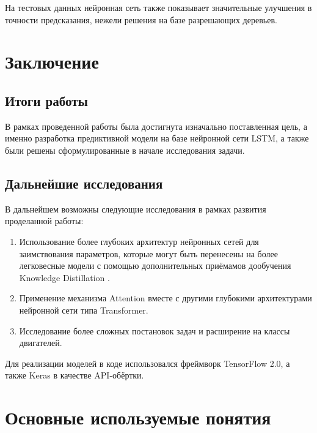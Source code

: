 \documentclass[14pt]{extarticle}
\begin{document}
На тестовых данных нейронная сеть также показывает значительные улучшения в точности предсказания, нежели решения на базе разрешающих деревьев.

\newpage

\section{Заключение}

\subsection{Итоги работы}

В рамках проведенной работы была достигнута изначально поставленная цель, а именно разработка предиктивной модели на базе нейронной сети LSTM, а также были решены сформулированные в начале исследования задачи. 

\subsection{Дальнейшие исследования}

В дальнейшем возможны следующие исследования в рамках развития проделанной работы:

\begin{enumerate}
\item Использование более глубоких архитектур нейронных сетей  для заимствования параметров, которые могут быть перенесены на более легковесные модели с помощью дополнительных приёмамов дообучения Knowledge Distillation \cite{44873}.

\item Применение механизма Attention вместе с другими глубокими архитектурами нейронной сети типа Transformer.

\item Исследование более сложных постановок задач и расширение на классы двигателей.

\end{enumerate}

Для реализации моделей в коде использовался фреймворк TensorFlow 2.0, а также Keras в качестве API-обёртки.

\newpage

\section*{Основные используемые понятия}
\end{document}

